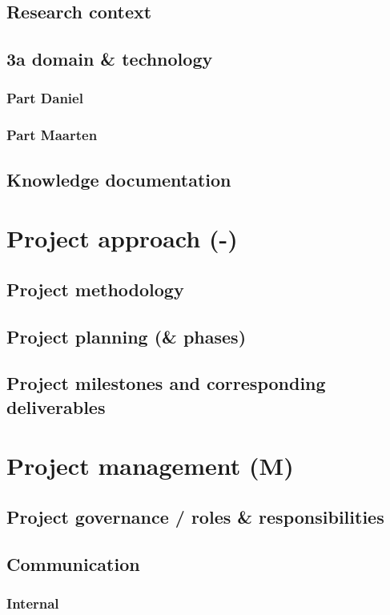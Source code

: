 \documentclass[a4paper,12pt,abstracton,titlepage]{scrartcl}
\begin{document}
\subsection{Research context}
\subsection{3a domain \& technology}
\subsubsection{Part Daniel}
\subsubsection{Part Maarten}
\subsection{Knowledge documentation}

\section{Project approach (-)}
\subsection{Project methodology}
\subsection{Project planning (\& phases)}
\subsection{Project milestones and corresponding deliverables }

\section{Project management (M)}
\subsection{Project governance / roles \& responsibilities}
\subsection{Communication}
\subsubsection{Internal}
\end{document}
